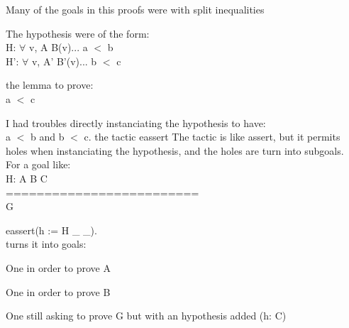 \small
Many of the goals in this proofs were with {\purple split inequalities}
\blist
\item The hypothesis were of the form:\\
H: $\forall$ v, A \rarrow B(v)... \rarrow a $<$ b\\
H': $\forall$ v, A' \rarrow B'(v)... \rarrow b $<$ c
\item the lemma to prove:\\
a $<$ c
\item
I had troubles {\purple directly} instanciating the hypothesis to have:\\
a $<$ b and b $<$ c.
\elist
\rarrow the tactic {\purple eassert}
\small
The tactic is like assert, but it permits {\purple holes} when
instanciating the hypothesis, and the  holes are turn 
{\purple into subgoals}.\\
For a goal like:\\
H: A \rarrow B \rarrow C\\
=========================\\
G


eassert(h := H \_ \_).\\
turns it into { goals}:
\blist
\item One in order to prove A
\item One in order to prove B
\item One still asking to prove G
but with an hypothesis added (h: C)
\elist
